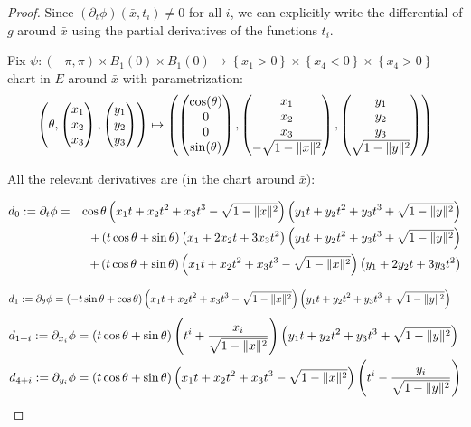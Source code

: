 \documentclass[9pt]{article}
\begin{document}
\begin{proof}
  Since $(\partial_t \phi)(\bar x, t_i) \neq 0$ for all $i$, we can explicitly write the differential of $g$ around $\bar x$ using the partial derivatives of the functions $t_i$.

  Fix $\psi: \left(-\pi, \pi \right)\times B_1(0) \times B_1(0)\rightarrow \left\{ x_1 > 0\right\}\times \left\{ x_4 <0\right\}\times \left\{ x_4 >0\right\}$ chart in $E$ around $\bar{x}$ with parametrization:
  \[
    \left(\theta, \begin{pmatrix}x_1\\ x_2 \\ x_3\end{pmatrix},\begin{pmatrix}y_1\\y_2\\y_3\end{pmatrix}\right) \mapsto \left(\begin{pmatrix}\cos(\theta)\\ 0\\ 0\\ \sin(\theta)\end{pmatrix}, \begin{pmatrix}x_1\\ x_2 \\ x_3\\-\sqrt{1-\lVert x \rVert^2}\end{pmatrix},\begin{pmatrix}y_1\\y_2\\y_3\\\sqrt{1-\lVert y \rVert^2}\end{pmatrix}\right)
  \]


  All the relevant derivatives are (in the chart around $\bar x$):

  \begin{align*}
    d_0:=\partial_t\phi &=& \cos\theta\left(x_1t + x_2t^2 + x_3t^3 - \sqrt{1-\lVert x \rVert^2}\right)\left(y_1t + y_2t^2 + y_3t^3+\sqrt{1-\lVert y \rVert^2}\right)\\
                   & &+ \left(t\cos\theta +\sin\theta\right)\left( x_1+ 2x_2t + 3x_3t^2\right)\left(y_1t + y_2t^2 + y_3t^3+\sqrt{1-\lVert y \rVert^2}\right)\\
                   & &+ \left(t\cos\theta +\sin\theta\right)\left(x_1t + x_2t^2 + x_3t^3 - \sqrt{1-\lVert x \rVert^2}\right)\left( y_1+ 2y_2t + 3y_3t^2\right)
  \end{align*}

  \begin{align*}
    d_1:=\partial_\theta \phi &= \left(-t\sin\theta +\cos\theta\right)\left(x_1t + x_2t^2 + x_3t^3 - \sqrt{1-\lVert x \rVert^2}\right)\left(y_1t + y_2t^2 + y_3t^3+\sqrt{1-\lVert y \rVert^2}\right)
  \end{align*}
  \begin{align*}
    d_{1+i}:=\partial_{x_i} \phi &= \left(t\cos\theta +\sin\theta\right)\left( t^i + \frac{x_i}{\sqrt{1-\lVert x \rVert^2}}\right)\left(y_1t + y_2t^2 + y_3t^3+\sqrt{1-\lVert y \rVert^2}\right)\\
    d_{4+i}:=\partial_{y_i} \phi &= \left(t\cos\theta +\sin\theta\right)\left(x_1t + x_2t^2 + x_3t^3 - \sqrt{1-\lVert x \rVert^2}\right)\left( t^i - \frac{y_i}{\sqrt{1-\lVert y \rVert^2}} \right)
  \end{align*}


\end{proof}
\end{document}
